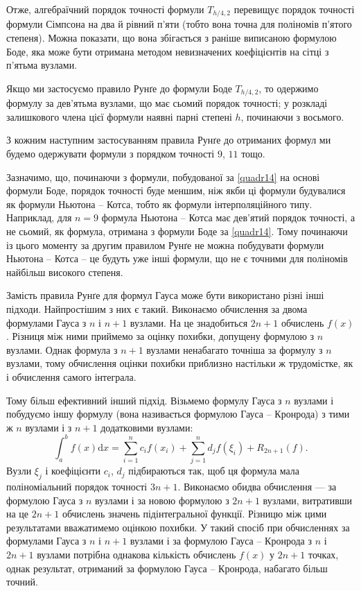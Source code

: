 \documentclass[14pt,twoside]{extreport}
\theoremstyle{mystyle}
\numberwithin{equation}{chapter}
\begin{document}
Отже, алгебраїчний порядок точності формули $T_{h/4,2}$ перевищує порядок точності формули Сімпсона на два й рівний п'яти (тобто вона точна для поліномів п'ятого степеня). Можна показати, що вона збігається з раніше виписаною формулою Боде, яка може бути отримана методом невизначених коефіцієнтів на сітці з п'ятьма вузлами.

Якщо ми застосуємо правило Рунґе до формули Боде $T_{h/4,2}$, то одержимо формулу за дев'ятьма вузлами, що має сьомий порядок точності; у розкладі залишкового члена цієї формули наявні парні степені $h$, починаючи з восьмого.

З кожним наступним застосуванням правила Рунґе до отриманих формул ми будемо одержувати формули з порядком точності $9$, $11$ тощо.

Зазначимо, що, починаючи з формули, побудованої за \eqref{quadr14} на основі формули Боде, порядок точності буде меншим, ніж якби ці формули будувалися як формули Ньютона -- Котса, тобто як формули інтерполяційного типу. Наприклад, для $n = 9$ формула Ньютона -- Котса має дев'ятий порядок точності, а не сьомий, як формула, отримана з формули Боде за \eqref{quadr14}. Тому починаючи із цього моменту за другим правилом Рунґе не можна побудувати формули Ньютона -- Котса -- це будуть уже інші формули, що не є точними для поліномів найбільш високого степеня.

Замість правила Рунґе для формул Гауса може бути використано різні інші підходи. Найпростішим з них є такий. Виконаємо обчислення за двома формулами Гауса з $n$ і $n + 1$ вузлами. На це знадобиться $2n + 1$ обчислень $f(x)$. Різниця між ними приймемо за оцінку похибки, допущену формулою з $n$ вузлами. Однак формула з $n + 1$ вузлами ненабагато точніша за формулу з $n$ вузлами, тому обчислення оцінки похибки приблизно настільки ж трудомістке, як і обчислення самого інтеграла.

Тому більш ефективний інший підхід. Візьмемо формулу Гауса з $n$ вузлами і побудуємо іншу формулу (вона називається формулою Гауса -- Кронрода) з тими ж $n$ вузлами і з $n + 1$ додатковими вузлами:
\[
\int_{a}^{b} f(x) \mathrm{d}x = \sum_{i=1}^{n} c_i f(x_i) + \sum_{j=1}^{n} d_j f(\xi_i) + R_{2n+1}(f).
\]
Вузли $\xi_j$ і коефіцієнти $c_i$, $d_j$ підбираються так, щоб ця формула мала поліноміальний порядок точності $3n + 1$. Виконаємо обидва обчислення — за формулою Гауса з $n$ вузлами і за новою формулою з $2n+1$ вузлами, витративши на це $2n+1$ обчислень значень підінтегральної функції. Різницю між цими результатами вважатимемо оцінкою похибки. У такий спосіб при обчисленнях за формулами Гауса з $n$ і $n+1$ вузлами і за формулою Гауса -- Кронрода з $n$ і $2n+1$ вузлами потрібна однакова кількість обчислень $f(x)$ у $2n + 1$ точках, однак результат, отриманий за формулою Гауса -- Кронрода, набагато більш точний.
\end{document}
